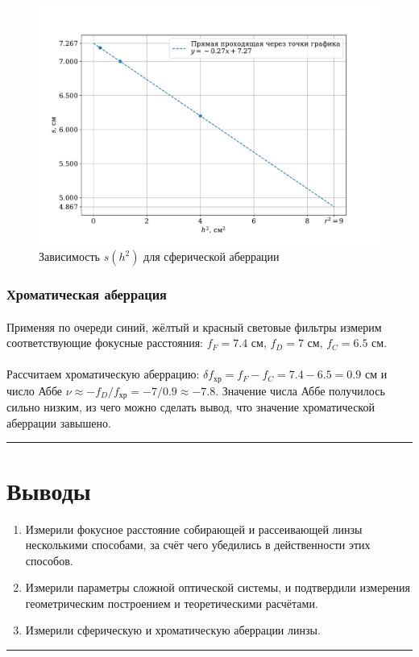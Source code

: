 \documentclass[a4paper,12pt]{article} %
\begin{document}
\begin{figure}
\centering
\includegraphics[width=\textwidth]{sphere.pdf}
\caption{Зависимость $s(h^2)$ для сферической аберрации}
\label{fig:shpere}
\end{figure}

\subsubsection{Хроматическая аберрация}

\paragraph{} Применяя по очереди синий, жёлтый и красный световые фильтры измерим соответствующие фокусные расстояния: $f_F = 7.4$ см, $f_D = 7$ см, $f_C = 6.5$ см. 

\paragraph{} Рассчитаем хроматическую аберрацию: $\delta f_\text{хр} = f_F - f_C = 7.4 - 6.5 = 0.9$ см и число Аббе $\nu \approx - f_D / f_\text{хр} = - 7 / 0.9 \approx - 7.8$. Значение числа Аббе получилось сильно низким, из чего можно сделать вывод, что значение хроматической аберрации завышено.

\medskip\hrule\medskip

\section{Выводы}

\begin{enumerate}
\item Измерили фокусное расстояние собирающей и рассеивающей линзы несколькими способами, за счёт чего убедились в действенности этих способов.
\item Измерили параметры сложной оптической системы, и подтвердили измерения геометрическим построением и теоретическими расчётами.
\item Измерили сферическую и хроматическую аберрации линзы.
\end{enumerate}

\medskip\hrule\medskip
\end{document}
